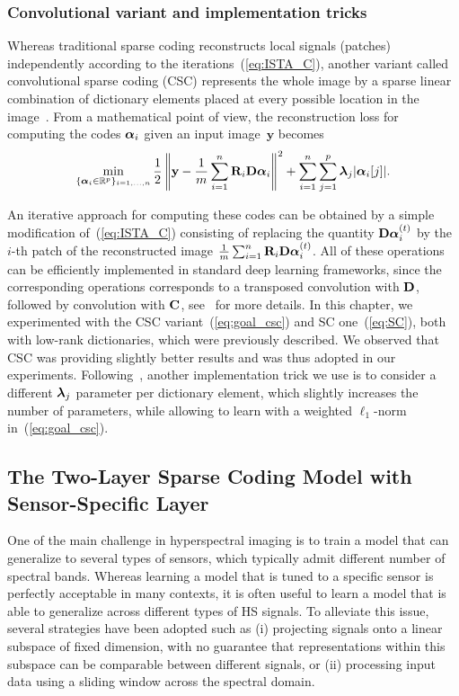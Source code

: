 \subsubsection{Convolutional variant and implementation tricks}

Whereas traditional sparse coding reconstructs local signals (patches) independently according to the iterations~(\ref{eq:ISTA_C}), another variant called convolutional sparse coding (CSC) represents the whole image by a sparse linear combination of dictionary elements placed at every possible location in the image~\cite{simon_rethinking_2019}. 
From a mathematical point of view, the reconstruction loss for computing the codes $\boldsymbol \alpha_i$ given an input image~$\mathbf y$ becomes
\begin{equation}
\label{eq:goal_csc}
\min_{\{\boldsymbol \alpha_i \in \mathbb R^p\}_{i=1,\ldots,n}} \frac{1}{2} \left\| \mathbf{y} - \frac{1}{m} \sum_{i=1}^{n} \mathbf{R}_i {\mathbf D} \mathbf{\boldsymbol \alpha}_i \right\|^2 + \sum_{i=1}^n \sum_{j=1}^p \boldsymbol \lambda_j |{\boldsymbol \alpha}_i[j]|.
\end{equation}

An iterative approach for computing these codes can be obtained by a simple modification of~(\ref{eq:ISTA_C}) consisting of replacing the quantity $\mathbf D \boldsymbol \alpha_i^{(t)}$ by the $i$-th patch of the reconstructed image $\frac{1}{m} \sum_{i=1}^{n} \mathbf{R}_i {\mathbf D} \mathbf{\boldsymbol \alpha}_i^{(t)}$.
All of these operations can be efficiently implemented in standard deep learning frameworks, since the corresponding operations corresponds to a transposed convolution with $\mathbf D$, followed by convolution with $\mathbf C$, see~\cite{simon_rethinking_2019} for more details. 
In this chapter, we experimented with the CSC variant~(\ref{eq:goal_csc}) and SC one~(\ref{eq:SC}), both with low-rank dictionaries, which were previously described. 
We observed that CSC was providing slightly better results and was thus adopted in our experiments.
Following~\cite{lecouat_fully_2020}, another implementation trick we use is to consider a different $\boldsymbol \lambda_j$ parameter per dictionary element, which slightly increases the number of parameters, while allowing to learn with a weighted $\ell_1$-norm in~(\ref{eq:goal_csc}).


\subsection{The Two-Layer Sparse Coding Model with Sensor-Specific Layer}
\label{subsec:vanilla}

One of the main challenge in hyperspectral imaging is to train a model that can generalize to several types of sensors, which typically admit different number of spectral bands.
Whereas learning a model that is tuned to a specific sensor is perfectly acceptable in many contexts, it is often useful to learn a model that is able to generalize across different types of HS signals.
To alleviate this issue, several strategies have been adopted such as (i) projecting signals onto a linear subspace of fixed dimension, with no guarantee that representations within this subspace can be comparable between different signals, or (ii) processing input data using a sliding window across the spectral domain.


